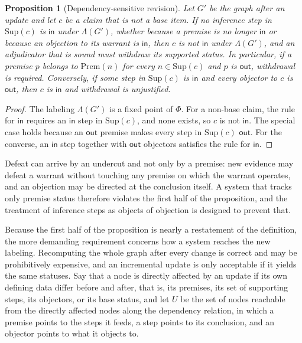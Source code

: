 \documentclass[12pt]{article}
\newtheorem{proposition}{Proposition}
\theoremstyle{definition}
\theoremstyle{remark}
\begin{document}
\begin{proposition}[Dependency-sensitive revision]
\label{prop:revision}
Let $G'$ be the graph after an update and let $c$ be a claim that is not a base item. If no inference step in $\mathrm{Sup}(c)$ is $\mathsf{in}$ under $\Lambda(G')$, whether because a premise is no longer $\mathsf{in}$ or because an objection to its warrant is $\mathsf{in}$, then $c$ is not $\mathsf{in}$ under $\Lambda(G')$, and an adjudicator that is sound must withdraw its supported status. In particular, if a premise $p$ belongs to $\mathrm{Prem}(n)$ for every $n\in\mathrm{Sup}(c)$ and $p$ is $\mathsf{out}$, withdrawal is required. Conversely, if some step in $\mathrm{Sup}(c)$ is $\mathsf{in}$ and every objector to $c$ is $\mathsf{out}$, then $c$ is $\mathsf{in}$ and withdrawal is unjustified.
\end{proposition}

\begin{proof}
The labeling $\Lambda(G')$ is a fixed point of $\Phi$. For a non-base claim, the rule for $\mathsf{in}$ requires an $\mathsf{in}$ step in $\mathrm{Sup}(c)$, and none exists, so $c$ is not $\mathsf{in}$. The special case holds because an $\mathsf{out}$ premise makes every step in $\mathrm{Sup}(c)$ $\mathsf{out}$. For the converse, an $\mathsf{in}$ step together with $\mathsf{out}$ objectors satisfies the rule for $\mathsf{in}$. \qedhere
\end{proof}

Defeat can arrive by an undercut and not only by a premise: new evidence may defeat a warrant without touching any premise on which the warrant operates, and an objection may be directed at the conclusion itself. A system that tracks only premise status therefore violates the first half of the proposition, and the treatment of inference steps as objects of objection is designed to prevent that.

Because the first half of the proposition is nearly a restatement of the definition, the more demanding requirement concerns how a system reaches the new labeling. Recomputing the whole graph after every change is correct and may be prohibitively expensive, and an incremental update is only acceptable if it yields the same statuses. Say that a node is directly affected by an update if its own defining data differ before and after, that is, its premises, its set of supporting steps, its objectors, or its base status, and let $U$ be the set of nodes reachable from the directly affected nodes along the dependency relation, in which a premise points to the steps it feeds, a step points to its conclusion, and an objector points to what it objects to.
\end{document}
